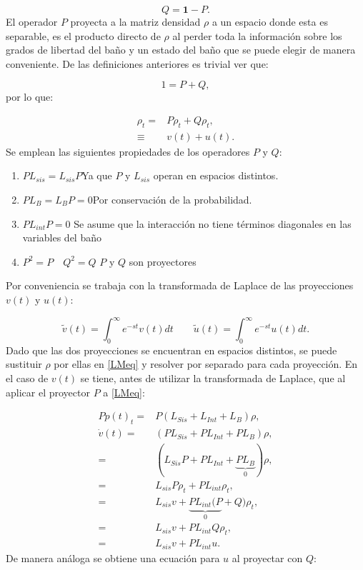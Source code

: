 \documentclass[a4paper,10pt]{report}
\begin{document}
\begin{equation}
Q = \mathbf{1}-P.
\end{equation} El operador $P$ proyecta a la matriz densidad $\rho$ a un espacio donde esta es separable, es el producto directo de $\rho$ al perder toda la información sobre los grados de libertad del baño y un estado del baño que se puede elegir de manera conveniente. De las definiciones anteriores es trivial ver que:

\begin{equation}
1 = P + Q,
\end{equation} por lo que:

\begin{align}
\rho_t =& P\rho_t + Q\rho_t ,\\
\equiv & v(t)+u(t).
\end{align} Se emplean las siguientes propiedades de los operadores $P$ y $Q$:

\begin{enumerate}
\item $ PL_{sis} = L_{sis}P$\qquad Ya que $ P $ y $ L_{sis} $ operan en espacios distintos.

\item $ PL_{B} = L_{B}P = 0 $\qquad Por conservación de la probabilidad.

\item $PL_{int}P=0$ \qquad Se asume que la interacción no tiene términos diagonales en las variables del baño

\item $P^2 = P \quad Q^2 = Q$ \qquad $P$ y $Q$ son proyectores
\end{enumerate}

Por conveniencia se trabaja con la transformada de Laplace \cite{ArfkenMM} de las proyecciones $v(t)$ y $u(t)$:

\begin{equation}
\tilde{v}(t) = \int_0^\infty e^{-st}v(t)dt \qquad \tilde{u}(t) = \int_0^\infty e^{-st}u(t)dt.
\end{equation} Dado que las dos proyecciones se encuentran en espacios distintos, se puede sustituir $\rho$ por ellas en \eqref{LMeq} y resolver por separado para cada proyección. En el caso de $v(t)$ se tiene, antes de utilizar la transformada de Laplace, que al aplicar el proyector $P$ a \eqref{LMeq}:

\begin{align*}
P\dot{p}(t)_t =& P(L_{Sis}+L_{Int}+L_B)\rho, \\
 \dot{v}(t) =& (PL_{Sis}+PL_{Int}+PL_B)\rho, \\
 =&(L_{Sis}P+PL_{Int}+\underbrace{PL_B}_0)\rho, \\
 =& L_{sis}P\rho_t + PL_{int}\rho_t, \\
 =& L_{sis}v + \underbrace{PL_{int}(P}_0+Q)\rho_t, \\
 =& L_{sis}v + PL_{int}Q\rho_t, \\
 =& L_{sis}v + PL_{int}u.
\end{align*} De manera análoga se obtiene una ecuación para $u$ al proyectar con $Q$:
\end{document}
